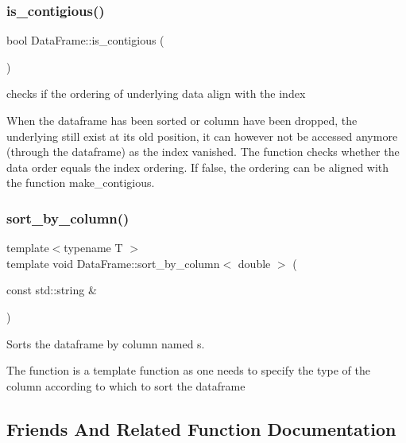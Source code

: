 \subsubsection{\texorpdfstring{is\+\_\+contigious()}{is\_contigious()}}
{\footnotesize\ttfamily bool Data\+Frame\+::is\+\_\+contigious (\begin{DoxyParamCaption}{ }\end{DoxyParamCaption})}



checks if the ordering of underlying data align with the index 

When the dataframe has been sorted or column have been dropped, the underlying still exist at its old position, it can however not be accessed anymore (through the dataframe) as the index vanished. The function checks whether the data order equals the index ordering. If false, the ordering can be aligned with the function {\ttfamily make\+\_\+contigious}. \mbox{\label{classDataFrame_a72c1c51a9562d55269477dabcc61ad12}} 
\subsubsection{\texorpdfstring{sort\+\_\+by\+\_\+column()}{sort\_by\_column()}}
{\footnotesize\ttfamily template$<$typename T $>$ \\
template void Data\+Frame\+::sort\+\_\+by\+\_\+column$<$ double $>$ (\begin{DoxyParamCaption}\item[{const std\+::string \&}]{ }\end{DoxyParamCaption})}



Sorts the dataframe by column named s. 

The function is a template function as one needs to specify the type of the column according to which to sort the dataframe 

\subsection{Friends And Related Function Documentation}
\mbox{\label{classDataFrame_ac665e1df1c1d41e0d0c5afcdfb827a74}} 
